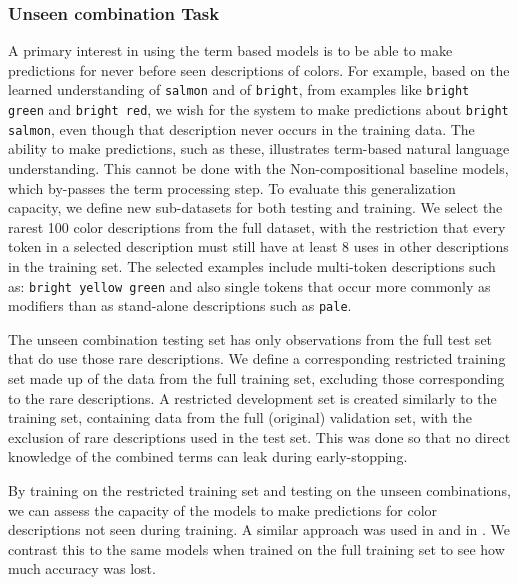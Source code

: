 \documentclass[]{clv3}
\newcommand{\textcite}{\citet}
\newcommand{\empmodel}{Non-compositional baseline} %
\begin{document}
\subsubsection{Unseen combination Task} \label{sec:extrapodata}
A primary interest in using the term based models is to be able to make predictions for never before seen descriptions of colors.
For example, based on the learned understanding of \texttt{salmon} and of \texttt{bright}, from examples like \texttt{bright green} and \texttt{bright red}, we wish for the system to make predictions about \texttt{bright salmon}, even though that description never occurs in the training data.
The ability to make predictions, such as these, illustrates term-based natural language understanding.
This cannot be done with the \empmodel{} models, which by-passes the term processing step.
%
To evaluate this generalization capacity, we define new sub-datasets for both testing and training.
We select the rarest 100 color descriptions from the full dataset,
with the restriction that every token in a selected description must still have at least 8 uses in other descriptions in the training set.
The selected examples include multi-token descriptions such as: \texttt{bright yellow green} and also single tokens that occur more commonly as modifiers than as stand-alone descriptions such as \texttt{pale}.

The unseen combination testing set has only observations from the full test set that do use those rare descriptions.
We define a corresponding restricted training set made up of the data from the full training set, excluding those  corresponding to the rare descriptions.
A restricted development set is created similarly to the training set, containing data from the full (original) validation set, with the exclusion of rare descriptions used in the test set.
This was done so that no direct knowledge of the combined terms can leak during early-stopping.


By training on the restricted training set and testing on the unseen combinations, we can assess the capacity of the models to make predictions for color descriptions not seen during training.
A similar approach was used in \textcite{acl2018WinnLighter} and in \textcite{DBLP:journals/corr/AtzmonBKGC16}.
We contrast this to the same models when trained on the full training set to see how much accuracy was lost.
\end{document}
